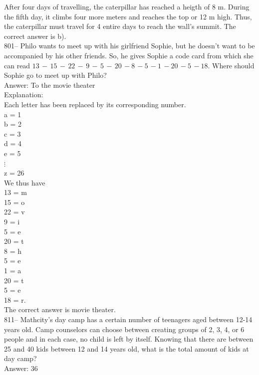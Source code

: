 \documentclass[letterpaper, 12pt]{article}
\begin{document}
After four days of travelling, the caterpillar has reached a heigth of 8 m. During the fifth day, it climbs four more meters and reaches the top or 12 m high.  Thus, the caterpillar must travel for 4 entire days to reach the wall's summit.
The correct answer is b).\\

801-- Philo wants to meet up with his girlfriend Sophie, but he doesn't want to be accompanied by his other friends. So, he gives Sophie a code card from which she can read $13\,-\,15\,-\,22\,-\,9\,-\,5\,-\,20\,-8\,-5\,-1\,-20\,-5\,-18$.
Where should Sophie go to meet up with Philo?\\

Answer: To the movie theater\\

Explanation: \\
Each letter has been replaced by its corresponding number. \\
a = 1\\
b = 2\\
c = 3\\
d = 4\\
e = 5\\
$\vdots$\\
z = 26\\

We thus have\\
13 = m\\
15 = o\\
22 = v\\
9 = i\\
5 = e\\
20 = t\\
8 = h\\
5 = e\\
1 = a\\
20 = t\\
5 = e\\
18 = r.\\

The correct answer is movie theater.\\

811-- Mathcity's day camp has a certain number of teenagers aged between 12-14 years old. Camp counselors can choose between creating groups of 2, 3, 4, or 6 people and in each case, no child is left by itself.  Knowing that there are between 25 and 40 kids between 12 and 14 years old, what is the total amount of kids at day camp?\\

Answer: 36\\
\end{document}
